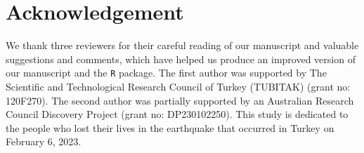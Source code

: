 \section*{Acknowledgement}

We thank three reviewers for their careful reading of our manuscript and valuable suggestions and comments, which have helped us produce an improved version of our manuscript and the \texttt{R} package. The first author was supported by The Scientific and Technological Research Council of Turkey (TUBITAK) (grant no: 120F270). The second author was partially supported by an Australian Research Council Discovery Project (grant no: DP230102250). This study is dedicated to the people who lost their lives in the earthquake that occurred in Turkey on February 6, 2023.



\address{Ufuk Beyaztas\\
  Marmara University\\
  Department of Statistics, Goztepe Campus, 34722, Kadikoy, Istanbul\\
  Turkey\\
  (ORCID 0000-0002-5208-4950)\\
  }

\address{Han Lin Shang\\
  Macquarie University\\
  Department of Actuarial Studies and Business Analytics, Level 7, 4 Eastern Road, Sydney, NSW 2109\\
  Australia\\
  (ORCID 0000-0003-1769-6430)\\
  }
